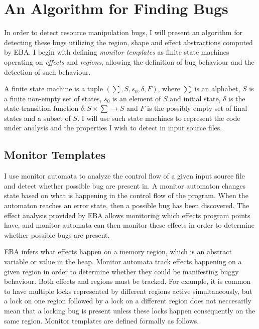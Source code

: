 \section{An Algorithm for Finding Bugs}
In order to detect resource manipulation bugs, I will present an algorithm for detecting these bugs utilizing the region, shape and effect abstractions computed by EBA. I begin with defining \textit{monitor templates} as finite state machines operating on \textit{effects} and \textit{regions}, allowing the definition of bug behaviour and the detection of such behaviour. 

\newpar A finite state machine is a tuple $(\sum, S, s_0, \delta, F)$, where $\sum$ is an alphabet, $S$ is a finite non-empty set of states, $s_0$ is an element of $S$ and initial state, $\delta$ is the state-transition function $\delta: S \times \sum \rightarrow S$ and $F$ is the possibly empty set of final states and a subset of $S$. I will use such state machines to represent the code under analysis and the properties I wish to detect in input source files. 

\subsection{Monitor Templates}
\label{monitor-template-section}
\noindent I use monitor automata to analyze the control flow of a given input source file and detect whether possible bug are present in. A monitor automaton changes state based on what is happening in the control flow of the program. When the automaton reaches an error state, then a possible bug has been discovered. The effect analysis provided by EBA allows monitoring which effects program points have, and monitor automata can then monitor these effects in order to determine whether possible bugs are present. 

\newpar EBA infers what effects happen on a memory region, which is an abstract variable or value in the heap. Monitor automata track effects happening on a given region in order to determine whether they could be manifesting buggy behaviour. Both effects and regions must be tracked. For example, it is common to have multiple locks represented by different regions active simultaneously, but a lock on one region followed by a lock on a different region does not neccesarily mean that a locking bug is present unless these locks happen consequently on the same region. Monitor templates are defined formally as follows. 

